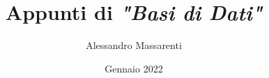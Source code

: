 \documentclass[a4paper, 10pt]{report}
\title{Appunti di \textit{"Basi di Dati"}}
\author{Alessandro Massarenti}
\date{Gennaio 2022}
\begin{document}
\maketitle

\tableofcontents










\lstlistoflistings
\end{document}
